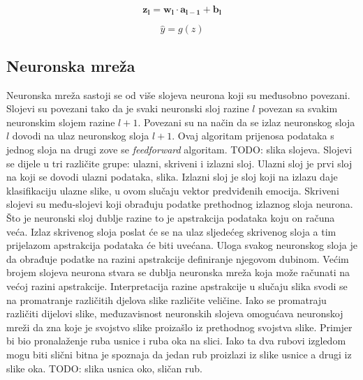 \documentclass[times, utf8, zavrsni,numeric,pstricks]{fer}
\newcommand{\vect}[1]{\boldsymbol{#1}}
\begin{document}
\begin{equation}\label{eq:neuron_layer}
	\boldsymbol{\vect{z_l}} = \vect{w_l} \cdot \vect{a_{l-1}} + \vect{b_l}
\end{equation}

\begin{equation}\label{eq:neuron_layer_func}
	\hat{y} = g(z)
\end{equation}

\subsection{Neuronska mreža}



Neuronska mreža sastoji se od više slojeva neurona koji su međusobno povezani. Slojevi su povezani tako da je svaki neuronski sloj razine $l$ povezan sa svakim neuronskim slojem razine $l+1$. Povezani su na način da se izlaz neuronskog sloja $l$ dovodi na ulaz neuronskog sloja $l+1$. Ovaj algoritam prijenosa podataka s jednog sloja na drugi zove se \textit{feedforward} algoritam. TODO: slika slojeva. Slojevi se dijele u tri različite grupe: ulazni, skriveni i izlazni sloj. Ulazni sloj je prvi sloj na koji se dovodi ulazni podataka, slika. Izlazni sloj je sloj koji na izlazu daje klasifikaciju ulazne slike, u ovom slučaju vektor predviđenih emocija. Skriveni slojevi su među-slojevi koji obrađuju podatke prethodnog izlaznog sloja neurona. Što je neuronski sloj dublje razine to je apstrakcija podataka koju on računa veća. Izlaz skrivenog sloja poslat će se na ulaz sljedećeg skrivenog sloja a tim prijelazom apstrakcija podataka će biti uvećana. Uloga svakog neuronskog sloja je da obrađuje podatke na razini apstrakcije definiranje njegovom dubinom. Većim brojem slojeva neurona stvara se dublja neuronska mreža koja može računati na većoj razini apstrakcije. Interpretacija razine apstrakcije u slučaju slika svodi se na promatranje različitih djelova slike različite veličine. Iako se promatraju različiti dijelovi slike, međuzavisnost neuronskih slojeva omogućava neuronskoj mreži da zna koje je svojstvo slike proizašlo iz prethodnog svojstva slike. Primjer bi bio pronalaženje ruba usnice i ruba oka na slici. Iako ta dva rubovi izgledom mogu biti slični bitna je spoznaja da jedan rub proizlazi iz slike usnice a drugi iz slike oka. TODO: slika usnica oko, sličan rub.
\end{document}
